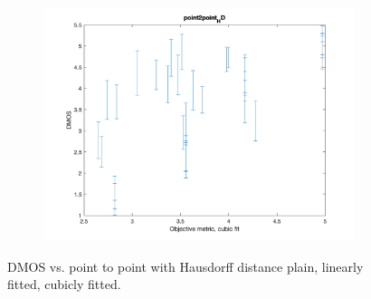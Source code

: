 \documentclass{article}
\begin{document}
\begin{figure}
   \begin{subfigure}[b]{0.65\textwidth}
   \includegraphics[width=\textwidth]{Figures/task3/p2p_hd_cubic.png}
   \end{subfigure}
    \caption{DMOS vs. point to point with Hausdorff distance plain, linearly fitted, cubicly fitted.}
    \label{fig:p2p_hd_fitted}
\end{figure}
\end{document}
